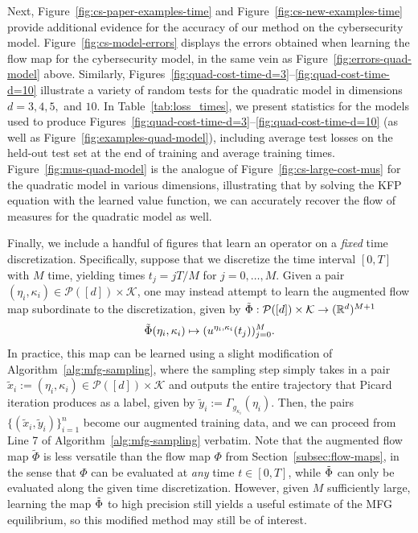 \documentclass[11pt,reqno]{amsart}
\numberwithin{equation}{section}
\theoremstyle{plain}
\newcommand{\R}{\mathbb{R}}
\newcommand{\calK}{{\mathcal K}}
\newcommand{\calP}{{\mathcal P}}
\newcommand{\1}{\boldsymbol{\mathbbm{1}}}
\begin{document}
Next, Figure~\ref{fig:cs-paper-examples-time} and Figure~\ref{fig:cs-new-examples-time} provide additional evidence for the accuracy of our method on the cybersecurity model. Figure~\ref{fig:cs-model-errors} displays the errors obtained when learning the flow map for the cybersecurity model, in the same vein as Figure~\ref{fig:errors-quad-model} above. Similarly, Figures~\ref{fig:quad-cost-time-d=3}--\ref{fig:quad-cost-time-d=10} illustrate a variety of random tests for the quadratic model in dimensions $d = 3, 4, 5,$ and $10$. In Table~\ref{tab:loss_times}, we present statistics for the models used to produce Figures~\ref{fig:quad-cost-time-d=3}--\ref{fig:quad-cost-time-d=10} (as well as Figure~\ref{fig:examples-quad-model}), including average test losses on the held-out test set at the end of training and average training times. Figure~\ref{fig:mus-quad-model} is the analogue of Figure~\ref{fig:cs-large-cost-mus} for the quadratic model in various dimensions, illustrating that by solving the KFP equation with the learned value function, we can accurately recover the flow of measures for the quadratic model as well.

Finally, we include a handful of figures that learn an operator on a \textit{fixed} time discretization. Specifically, suppose that we discretize the time interval $[0, T]$ with $M$ time, yielding times $t_j = j T / M$ for $j = 0, \ldots, M$. Given a pair $(\eta_i, \kappa_i) \in \calP([d]) \times \calK$, one may instead attempt to learn the augmented flow map subordinate to the discretization, given by $ \Tilde{\Phi} : \calP([d]) \times \calK \to (\R^d)^{M + 1}$
\begin{align*}
    \Tilde{\Phi}(\eta_i, \kappa_i) \mapsto (u^{\eta_i, \kappa_i}(t_j))_{j=0}^M.
\end{align*}
In practice, this map can be learned using a slight modification of Algorithm~\ref{alg:mfg-sampling}, where the sampling step simply takes in a pair $\tilde{x}_i := (\eta_i, \kappa_i) \in \calP([d]) \times \calK$ and outputs the entire trajectory that Picard iteration produces as a label, given by $\tilde{y}_i := \Gamma_{g_{\kappa_i}}(\eta_i)$. Then, the pairs $\{(\tilde{x}_i, \tilde{y}_i)\}_{i=1}^n$ become our augmented training data, and we can proceed from Line 7 of Algorithm~\ref{alg:mfg-sampling} verbatim. Note that the augmented flow map $\tilde{\Phi}$ is less versatile than the flow map $\Phi$ from Section~\ref{subsec:flow-maps}, in the sense that $\Phi$ can be evaluated at \textit{any} time $t \in [0, T]$, while $\Tilde{\Phi}$ can only be evaluated along the given time discretization. However, given $M$ sufficiently large, learning the map $\Tilde{\Phi}$ to high precision still yields a useful estimate of the MFG equilibrium, so this modified method may still be of interest.
\end{document}
